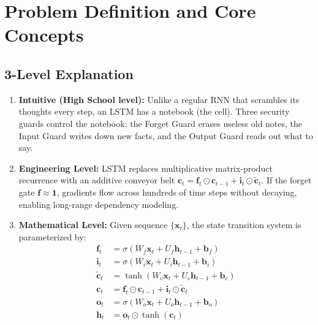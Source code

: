 \documentclass[11pt,a4paper]{article}
\theoremstyle{definition}
\begin{document}
\section{Problem Definition and Core Concepts}

\subsection{3-Level Explanation}
\begin{enumerate}
    \item \textbf{Intuitive (High School level):} Unlike a regular RNN that scrambles its thoughts every step, an LSTM has a notebook (the cell). Three security guards control the notebook: the Forget Guard erases useless old notes, the Input Guard writes down new facts, and the Output Guard reads out what to say.
    \item \textbf{Engineering Level:} LSTM replaces multiplicative matrix-product recurrence with an additive conveyor belt $\mathbf{c}_t = \mathbf{f}_t \odot \mathbf{c}_{t-1} + \mathbf{i}_t \odot \tilde{\mathbf{c}}_t$. If the forget gate $\mathbf{f} \approx \mathbf{1}$, gradients flow across hundreds of time steps without decaying, enabling long-range dependency modeling.
    \item \textbf{Mathematical Level:} Given sequence $\{\mathbf{x}_t\}$, the state transition system is parameterized by:
    \begin{align}
    \mathbf{f}_t &= \sigma(W_f \mathbf{x}_t + U_f \mathbf{h}_{t-1} + \mathbf{b}_f) \\
    \mathbf{i}_t &= \sigma(W_i \mathbf{x}_t + U_i \mathbf{h}_{t-1} + \mathbf{b}_i) \\
    \tilde{\mathbf{c}}_t &= \tanh(W_c \mathbf{x}_t + U_c \mathbf{h}_{t-1} + \mathbf{b}_c) \\
    \mathbf{c}_t &= \mathbf{f}_t \odot \mathbf{c}_{t-1} + \mathbf{i}_t \odot \tilde{\mathbf{c}}_t \\
    \mathbf{o}_t &= \sigma(W_o \mathbf{x}_t + U_o \mathbf{h}_{t-1} + \mathbf{b}_o) \\
    \mathbf{h}_t &= \mathbf{o}_t \odot \tanh(\mathbf{c}_t)
    \end{align}
\end{enumerate}
\end{document}
